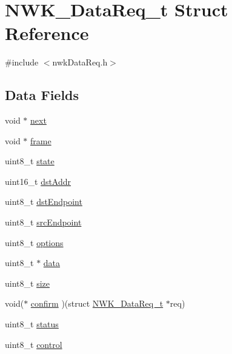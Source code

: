 \hypertarget{struct_n_w_k___data_req__t}{\section{N\-W\-K\-\_\-\-Data\-Req\-\_\-t Struct Reference}
\label{struct_n_w_k___data_req__t}
}


{\ttfamily \#include $<$nwk\-Data\-Req.\-h$>$}

\subsection*{Data Fields}
\begin{DoxyCompactItemize}
\item 
void $\ast$ \hyperlink{struct_n_w_k___data_req__t_ad65dbd940c857fd96647bd144af3b44e}{next}
\item 
void $\ast$ \hyperlink{struct_n_w_k___data_req__t_a235bf18122d436409f1802efbfe81052}{frame}
\item 
uint8\-\_\-t \hyperlink{struct_n_w_k___data_req__t_a5a35c6f856e9a88ff80d5a1894e1bc8c}{state}
\item 
uint16\-\_\-t \hyperlink{struct_n_w_k___data_req__t_aeaec216601ad5b729ed4fca5ec34c0e4}{dst\-Addr}
\item 
uint8\-\_\-t \hyperlink{struct_n_w_k___data_req__t_ae75d2ea1c6fc4ad9dd7836891b5e9d31}{dst\-Endpoint}
\item 
uint8\-\_\-t \hyperlink{struct_n_w_k___data_req__t_a5839b1eb932cb128c133abe2f6661b95}{src\-Endpoint}
\item 
uint8\-\_\-t \hyperlink{struct_n_w_k___data_req__t_af6f70d81c7dd2d4351ab36df18fbf074}{options}
\item 
uint8\-\_\-t $\ast$ \hyperlink{struct_n_w_k___data_req__t_a36517216442cbc732d1197cef8307daf}{data}
\item 
uint8\-\_\-t \hyperlink{struct_n_w_k___data_req__t_a2057b79ca45a0a0ad6ab4ab80e66177e}{size}
\item 
void($\ast$ \hyperlink{struct_n_w_k___data_req__t_a63681af7f9b5392167e681790d9d0f70}{confirm} )(struct \hyperlink{struct_n_w_k___data_req__t}{N\-W\-K\-\_\-\-Data\-Req\-\_\-t} $\ast$req)
\item 
uint8\-\_\-t \hyperlink{struct_n_w_k___data_req__t_abbb3d47babe69c1cae446f6f5f16e2ee}{status}
\item 
uint8\-\_\-t \hyperlink{struct_n_w_k___data_req__t_aeb53342e48a4c8f2864dcde773f15f77}{control}
\end{DoxyCompactItemize}



